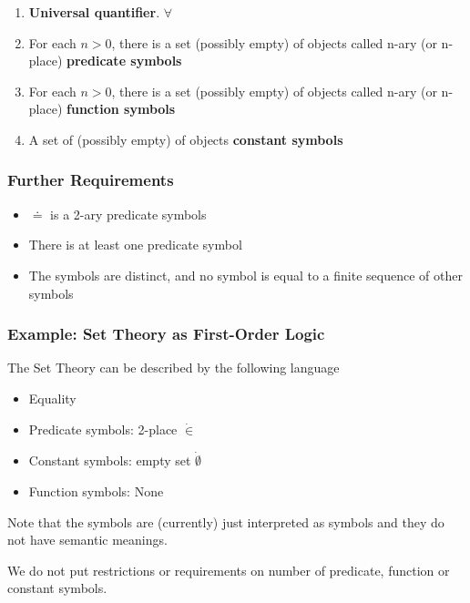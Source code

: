 \begin{enumerate}
    \item \textbf{Universal quantifier}. $\forall$
    \item For each $n>0$, there is a set (possibly empty) of objects called n-ary (or n-place) \textbf{predicate symbols}
    \item For each $n>0$, there is a set (possibly empty) of objects called n-ary (or n-place) \textbf{function symbols}
    \item A set of (possibly empty) of objects \textbf{constant symbols}
\end{enumerate}

\subsubsection{Further Requirements}

\begin{itemize}
    \item $\doteq$ is a 2-ary predicate symbols
    \item There is at least one predicate symbol
    \item The symbols are distinct, and no symbol is equal to a finite sequence of other symbols
\end{itemize}

\subsubsection{Example: Set Theory as First-Order Logic}

The Set Theory can be described by the following language

\begin{itemize}
    \item Equality
    \item Predicate symbols: 2-place $\dot{\in}$
    \item Constant symbols: empty set $\dot{\emptyset}$
    \item Function symbols: None
\end{itemize}

Note that the symbols are (currently) just interpreted as symbols and they do not have semantic meanings.

\begin{remark}
    We do not put restrictions or requirements on number of predicate, function or constant symbols.
\end{remark}

